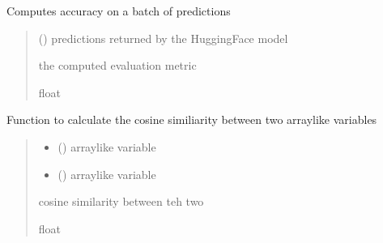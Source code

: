 \documentclass[letterpaper,10pt,english]{sphinxmanual}
\begin{document}

\begin{fulllineitems}
\label{\detokenize{auxilary_functions:auxilary_functions.compute_metrics}}
\pysigstartsignatures
{}
\pysigstopsignatures
\sphinxAtStartPar
Computes accuracy on a batch of predictions
\begin{quote}\begin{description}
\sphinxAtStartPar
{} () \textendash{} predictions returned by the HuggingFace model

\sphinxAtStartPar
the computed evaluation metric

\sphinxAtStartPar
float

\end{description}\end{quote}

\end{fulllineitems}


\begin{fulllineitems}
\label{\detokenize{auxilary_functions:auxilary_functions.cos_func}}
\pysigstartsignatures
{}
\pysigstopsignatures
\sphinxAtStartPar
Function to calculate the cosine similiarity between two array\sphinxhyphen{}like variables
\begin{quote}\begin{description}
\begin{itemize}
\item {} 
\sphinxAtStartPar
{} () \textendash{} array\sphinxhyphen{}like variable

\item {} 
\sphinxAtStartPar
{} () \textendash{} array\sphinxhyphen{}like variable

\end{itemize}

\sphinxAtStartPar
cosine similarity between teh two

\sphinxAtStartPar
float

\end{description}\end{quote}

\end{fulllineitems}
\end{document}
